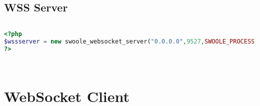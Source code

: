 \begin{lstlisting}[language=PHP]

\end{lstlisting}






\begin{lstlisting}[language=PHP]

\end{lstlisting}



\begin{lstlisting}[language=PHP]

\end{lstlisting}



\begin{lstlisting}[language=PHP]

\end{lstlisting}





\section{WSS Server}


\begin{lstlisting}[language=PHP]

\end{lstlisting}





\begin{lstlisting}[language=PHP]
<?php
$wssserver = new swoole_websocket_server("0.0.0.0",9527,SWOOLE_PROCESS,);
?>
\end{lstlisting}




\begin{lstlisting}[language=PHP]

\end{lstlisting}




\begin{lstlisting}[language=PHP]

\end{lstlisting}


\chapter{WebSocket Client}

